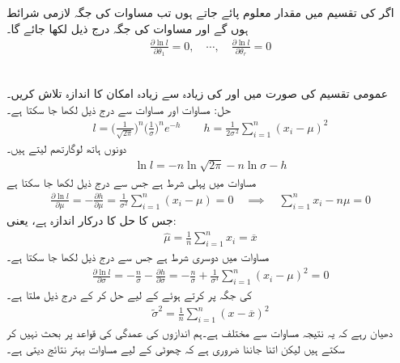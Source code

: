 اگر  کی تقسیم میں  مقدار معلوم  پائے جاتے ہوں تب مساوات  کی جگہ  لازمی شرائط  ہوں  گے اور مساوات  کی جگہ درج ذیل لکھا جائے گا۔ 
\begin{align}\label{مساوات_شماریات_زیادہ_سے_زیادہ_پ}
\frac{\partial \ln l}{\partial \theta_1}=0,\quad \cdots,\quad \frac{\partial \ln l}{\partial \theta_r}=0
\end{align}

\quad {}\\
عمومی تقسیم کی صورت میں  اور  کی زیادہ سے زیادہ امکان کا اندازہ تلاش کریں۔\\
حل:\quad
مساوات  اور  مساوات  سے درج ذیل لکھا جا سکتا ہے۔
\begin{align*}
l=\big(\frac{1}{\sqrt{2\pi}}\big)^n \big(\frac{1}{\sigma}\big)^n e^{-h}\quad \quad h=\frac{1}{2\sigma^{\,2}}\sum_{i=1}^{n}(x_i-\mu)^2
\end{align*}
دونوں ہاتھ لوگارتھم لیتے ہیں۔
\begin{align*}
\ln l=-n\ln \sqrt{2\pi}-n\ln \sigma-h
\end{align*} 
مساوات  میں پہلی شرط  ہے جس سے  درج ذیل لکھا جا سکتا ہے
\begin{align*}
\frac{\partial \ln l}{\partial \mu}=-\frac{\partial h}{\partial \mu}=\frac{1}{\sigma^2}\sum_{i=1}^{n}(x_i-\mu)=0\quad \implies \quad \sum_{i=1}^{n} x_i-n\mu=0
\end{align*}
جس کا حل  کا درکار اندازہ  ہے، یعنی:
\begin{align*}
\widehat{\mu}=\frac{1}{n}\sum_{i=1}^{n} x_i=\overline{x}
\end{align*} 
مساوات  میں دوسری شرط  ہے  جس سے  درج ذیل لکھا جا سکتا ہے۔
\begin{align*}
\frac{\partial \ln l}{\partial \sigma}=-\frac{n}{\sigma}-\frac{\partial h}{\partial \sigma}=-\frac{n}{\sigma}+\frac{1}{\sigma^3}\sum_{i=1}^{n} (x_i-\mu)^2=0
\end{align*}
 کی جگہ  پر کرتے ہوئے  کے لیے حل کر کے درج ذیل ملتا ہے۔
\begin{align*}
\widetilde{\sigma}^{2}=\frac{1}{n}\sum_{i=1}^{n} (x-\overline{x})^2
\end{align*}
دھیان رہے کہ یہ نتیجہ مساوات  سے مختلف ہے۔ہم اندازوں کی عمدگی کی قواعد پر بحث نہیں کر سکتے ہیں لیکن اتنا جاننا ضروری ہے کہ چھوٹی  کے لیے  مساوات  بہتر نتائج دیتی ہے۔

